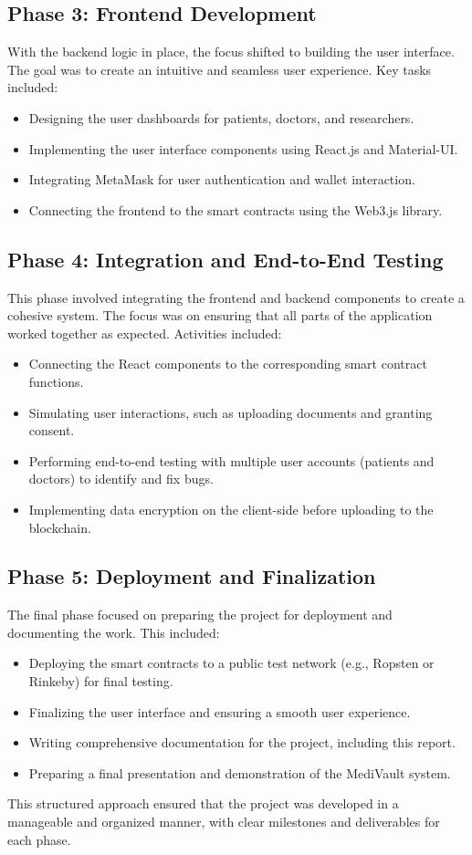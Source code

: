 \subsection{Phase 3: Frontend Development}
With the backend logic in place, the focus shifted to building the user interface. The goal was to create an intuitive and seamless user experience. Key tasks included:
\begin{itemize}
    \item Designing the user dashboards for patients, doctors, and researchers.
    \item Implementing the user interface components using React.js and Material-UI.
    \item Integrating MetaMask for user authentication and wallet interaction.
    \item Connecting the frontend to the smart contracts using the Web3.js library.
\end{itemize}

\subsection{Phase 4: Integration and End-to-End Testing}
This phase involved integrating the frontend and backend components to create a cohesive system. The focus was on ensuring that all parts of the application worked together as expected. Activities included:
\begin{itemize}
    \item Connecting the React components to the corresponding smart contract functions.
    \item Simulating user interactions, such as uploading documents and granting consent.
    \item Performing end-to-end testing with multiple user accounts (patients and doctors) to identify and fix bugs.
    \item Implementing data encryption on the client-side before uploading to the blockchain.
\end{itemize}

\subsection{Phase 5: Deployment and Finalization}
The final phase focused on preparing the project for deployment and documenting the work. This included:
\begin{itemize}
    \item Deploying the smart contracts to a public test network (e.g., Ropsten or Rinkeby) for final testing.
    \item Finalizing the user interface and ensuring a smooth user experience.
    \item Writing comprehensive documentation for the project, including this report.
    \item Preparing a final presentation and demonstration of the MediVault system.
\end{itemize}

This structured approach ensured that the project was developed in a manageable and organized manner, with clear milestones and deliverables for each phase.
